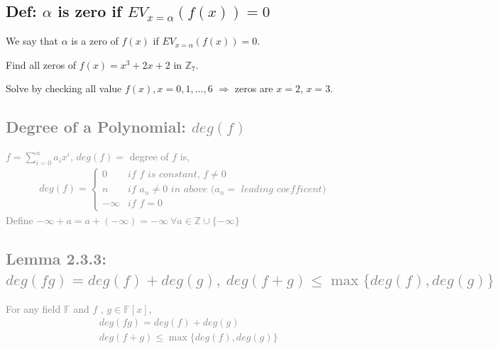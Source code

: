 \documentclass[11pt]{elegantbook}
\begin{document}
\subsection{Def: $\alpha$ is zero if $EV_{x=\alpha}(f(x))=0$}
\begin{definition}
    We say that $\alpha$ is a zero of $f(x)$ if $EV_{x=\alpha}(f(x))=0$.
\end{definition}
\begin{example}
    Find all zeros of $f(x)=x^3+2x+2$ in $\mathbb{Z}_7$.

    Solve by checking all value $f(x),x=0,1,...,6$ $\Rightarrow$ zeros are $x=2$, $x=3$.
\end{example}



\textcolor{gray}{
\section{Degree of a Polynomial: $deg(f)$}
$f=\sum_{i=0}^na_ix^i$, $deg(f)=$ degree of $f$ is,
\begin{equation}
    \begin{aligned}
        deg(f)=\left\{\begin{matrix}
            0& \textit{if $f$ is constant, $f\neq0$}\\
            n& \textit{if $a_n\neq0$ in above ($a_n=$ leading coefficent)}\\
            -\infty& \textit{if } f=0
        \end{matrix}\right.
    \end{aligned}
    \nonumber
\end{equation}
Define $-\infty+ a = a + (-\infty) = -\infty\ \forall a \in \mathbb{Z} \cup \{-\infty\}$
\subsection{Lemma 2.3.3: $deg(fg)=deg(f)+deg(g)
,\ deg(f+g)\leq\max\{deg(f),deg(g)\}$}
\begin{lemma}[Lemma 2.3.3]
    For any field $\mathbb{F}$ and $f$ , $g \in \mathbb{F}[x]$,
    \begin{equation}
        \begin{aligned}
            &deg(fg)=deg(f)+deg(g)\\
            &deg(f+g)\leq\max\{deg(f),deg(g)\}
        \end{aligned}
        \nonumber
    \end{equation}
\end{lemma}
}
\end{document}
